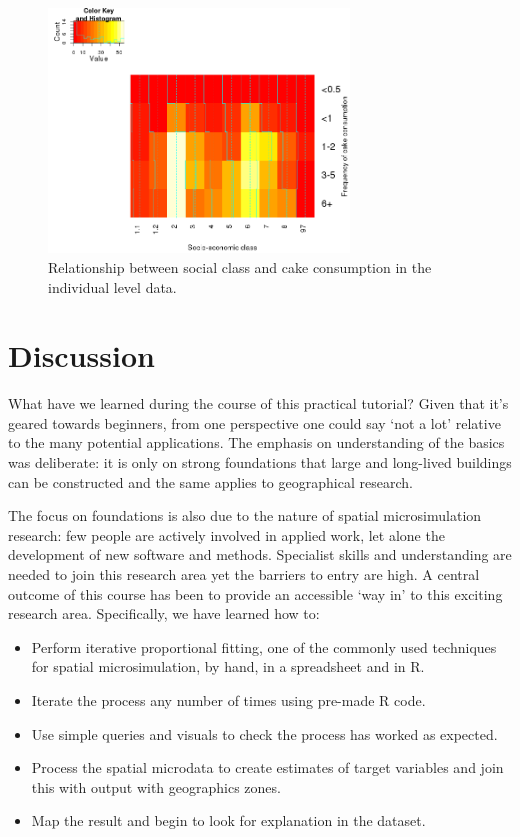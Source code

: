 \documentclass[a4paper, 11pt, twoside]{article}
\begin{document}
\begin{figure}
\centering
 \includegraphics[width=8cm]{hm}
\caption{Relationship between social class and cake consumption in the
individual level data.}
\label{hm}
\end{figure}

\section{Discussion}

What have we learned during the course of this practical tutorial?
Given that it's geared towards beginners, from one perspective
one could say `not a lot' relative to the many potential applications.
The emphasis on understanding of the basics was deliberate: it is only
on strong foundations that large and long-lived buildings can be 
constructed and the same applies to geographical research.

The focus on foundations is also due to the nature of spatial microsimulation
research: few people are actively involved in applied work, let alone the
development of new software and methods.
Specialist skills and understanding are needed to join this research area
yet the barriers to entry are high.
A central outcome of this course has been to provide an accessible `way in'
to this exciting research area. Specifically, we have learned how to:
\begin{itemize}
 \item Perform iterative proportional fitting, one of the commonly used
techniques for spatial microsimulation, by hand, in a spreadsheet and in R.
 \item Iterate the process any number of times using pre-made R code.
 \item Use simple queries and visuals to check the process has worked as expected.
 \item Process the spatial microdata to create estimates of target variables and
join this with output with geographics zones.
 \item Map the result and begin to look for explanation in the dataset.
\end{itemize}
\end{document}
